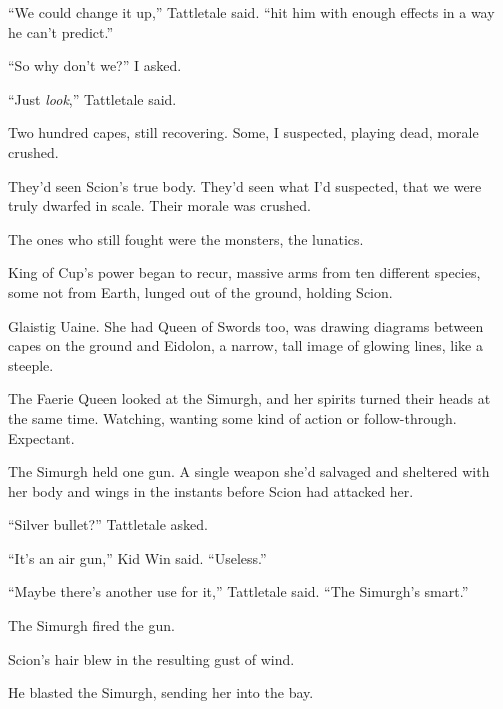 ``We could change it up,'' Tattletale said.  ``hit him with enough effects in a way he can't predict.''



``So why don't we?'' I asked.



``Just \emph{look},'' Tattletale said.



Two hundred capes, still recovering.  Some, I suspected, playing dead, morale crushed.



They'd seen Scion's true body.  They'd seen what I'd suspected, that we were truly dwarfed in scale.  Their morale was crushed.



The ones who still fought were the monsters, the lunatics.



King of Cup's power began to recur, massive arms from ten different species, some not from Earth, lunged out of the ground, holding Scion.



Glaistig Uaine.  She had Queen of Swords too, was drawing diagrams between capes on the ground and Eidolon, a narrow, tall image of glowing lines, like a steeple.



The Faerie Queen looked at the Simurgh, and her spirits turned their heads at the same time.  Watching, wanting some kind of action or follow-through.  Expectant.



The Simurgh held one gun.  A single weapon she'd salvaged and sheltered with her body and wings in the instants before Scion had attacked her.



``Silver bullet?'' Tattletale asked.



``It's an air gun,'' Kid Win said.  ``Useless.''



``Maybe there's another use for it,'' Tattletale said.  ``The Simurgh's smart.''



The Simurgh fired the gun.



Scion's hair blew in the resulting gust of wind.



He blasted the Simurgh, sending her into the bay.



